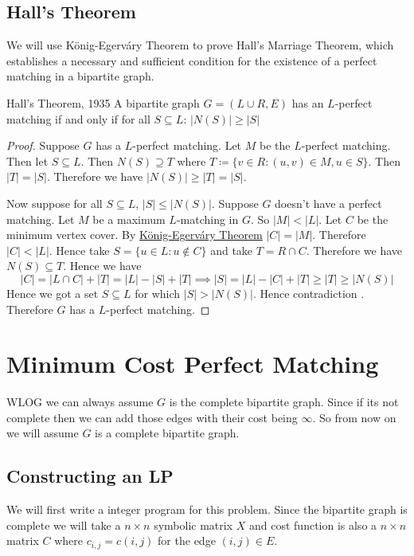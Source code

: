 \subsection{Hall's Theorem}
We will use K\"{o}nig-Egerv\'{a}ry Theorem to prove Hall's Marriage Theorem, which establishes a necessary and sufficient condition for the existence of a perfect matching in a bipartite graph.
\begin{Theorem}{Hall's Theorem, 1935}{}
	A bipartite graph $G=(L\cup R,E)$ has an $L$-perfect matching if and only if for all $S\subseteq L$: $|N(S)|\geq |S|$
\end{Theorem}
\begin{proof}
	Suppose $G$ has a $L$-perfect matching. Let $M$ be the $L$-perfect matching. Then let $S\subseteq L$. Then $N(S)\supseteq T$ where $T\coloneqq\{v\in R\colon (u,v)\in M, u\in S\}$. Then $|T|=|S|$. Therefore we have $|N(S)|\geq |T|=|S|$. 
	
	Now suppose for all $S\subseteq L$, $|S|\leq |N(S)|$. Suppose $G$ doesn't have a perfect matching. Let $M$ be a maximum $L$-matching in $G$. So $|M|<|L|$. Let $C$ be the minimum vertex cover. By \hyperref[th:konig-egervary]{K\"{o}nig-Egerv\'{a}ry Theorem} $|C|=|M|$. Therefore $|C|<|L|$. Hence take $S=\{u\in L\colon u\notin C\}$ and take $T=R\cap C$. Therefore we have $N(S)\subseteq T$. Hence we have $$|C|=|L\cap C|+|T|=|L|-|S|+|T|\implies |S|=|L|-|C|+|T|\geq |T|\geq |N(S)|$$Hence we got a set $S\subseteq L$ for which $|S|> |N(S)|$. Hence contradiction \ctr. Therefore $G$ has a $L$-perfect matching.
\end{proof}
\section{Minimum Cost Perfect Matching}
\begin{algoprob}
\end{algoprob}

WLOG we can always assume $G$ is the complete bipartite graph. Since if its not complete then we can add those edges with their cost being $\infty$. So from now on we will assume $G$ is a complete bipartite graph. 
\subsection{Constructing an LP}
We will first write a integer program for this problem. Since the bipartite graph is complete we will take a $n\times n$ symbolic matrix $X$ and cost function is also a $n\times n$ matrix $C$ where $c_{i,j}=c(i,j)$ for the edge $(i,j)\in E$.\parinf\vspace*{5mm}

